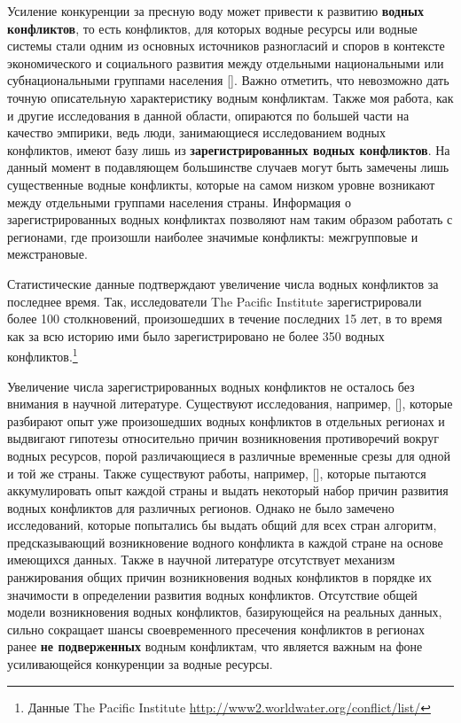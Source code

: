 \documentclass[a4paper, 12pt]{article}
\theoremstyle{plain} %
\theoremstyle{definition} %
\theoremstyle{remark} %
\begin{document}
Усиление конкуренции за пресную воду может привести к развитию \textbf{водных конфликтов}, то есть конфликтов, для которых водные ресурсы или водные системы стали одним из основных источников разногласий и споров в контексте экономического и социального развития между отдельными национальными или субнациональными группами населения [\cite{gleick2014water}]. 
Важно отметить, что невозможно дать точную описательную характеристику водным конфликтам. Также моя работа, как и другие исследования в данной области, опираются по большей части на качество эмпирики, ведь люди, занимающиеся исследованием водных конфликтов, имеют базу лишь из \textbf{зарегистрированных водных конфликтов}. На данный момент в подавляющем большинстве случаев могут быть замечены лишь существенные водные конфликты, которые на самом низком уровне возникают между отдельными группами населения страны. Информация о зарегистрированных водных конфликтах позволяют нам таким образом работать с регионами, где произошли наиболее значимые конфликты: межгрупповые и межстрановые.

Статистические данные подтверждают увеличение числа водных конфликтов за последнее время. Так, исследователи The Pacific Institute зарегистрировали более 100 столкновений, произошедших в течение последних 15 лет, в то время как за всю историю ими было зарегистрировано не более 350 водных конфликтов.\footnote{Данные The Pacific Institute \url{http://www2.worldwater.org/conflict/list/}}

Увеличение числа зарегистрированных водных конфликтов не осталось без внимания в научной литературе. Существуют исследования, например, [\cite{mosello}], которые разбирают опыт уже произошедших водных конфликтов в отдельных регионах и выдвигают гипотезы относительно причин возникновения противоречий вокруг водных ресурсов, порой различающиеся в различные временные срезы для одной и той же страны. Также существуют работы, например, [\cite{wolf2005}], которые пытаются аккумулировать опыт каждой страны и выдать некоторый набор причин развития водных конфликтов для различных регионов. Однако не было замечено исследований, которые попытались бы выдать общий для всех стран алгоритм, предсказывающий возникновение водного конфликта в каждой стране на основе имеющихся данных. Также в научной литературе отсутствует механизм ранжирования общих причин возникновения водных конфликтов в порядке их значимости в определении развития водных конфликтов. Отсутствие общей модели возникновения водных конфликтов, базирующейся на реальных данных, сильно сокращает шансы своевременного пресечения конфликтов в регионах ранее \textbf{не подверженных} водным конфликтам, что является важным на фоне усиливающейся конкуренции за водные ресурсы. 
\end{document}
